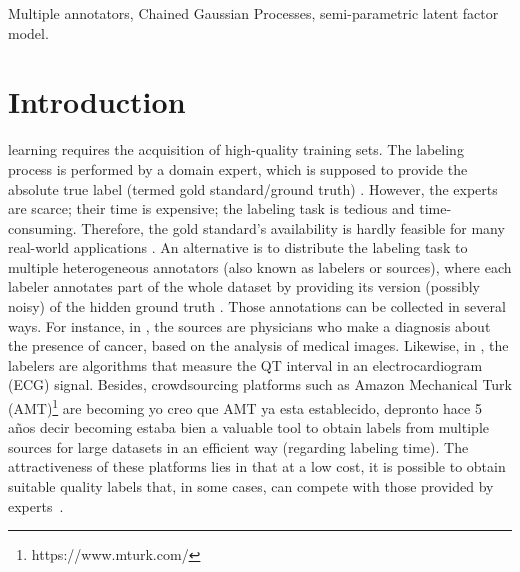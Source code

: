 \documentclass[journal]{IEEEtran}
\newcommand{\comment}[2]{{\color{blue}#1} {\color{red}#2}}
\begin{document}
\begin{IEEEkeywords}
Multiple annotators, Chained Gaussian Processes, semi-parametric latent factor model.
\end{IEEEkeywords}

%
\IEEEpeerreviewmaketitle



\section{Introduction}

 learning requires the acquisition of
high-quality training sets. The labeling process is performed by a
domain expert, which is supposed to provide the absolute true label
(termed gold standard/ground truth)
\citep{zhang2019crowdsourced}. However, the experts are scarce; their
time is expensive; the labeling task is tedious and
time-consuming. Therefore, the gold standard's availability is hardly
feasible for many real-world applications \citep{liu2020truth}. An
alternative is to distribute the labeling task to multiple
heterogeneous annotators (also known as labelers or sources), where
each labeler annotates part of the whole dataset by providing its
version (possibly noisy) of the hidden ground truth
\cite{kara2015modeling}. Those annotations can be collected in several
ways. For instance, in \cite{raykar2010learning}, the sources are
physicians who make a diagnosis about the presence of cancer, based on
the analysis of medical images. Likewise, in
\cite{zhu2019unsupervised}, the labelers are algorithms that measure
the QT interval in an electrocardiogram (ECG) signal. Besides,
crowdsourcing platforms such as Amazon Mechanical Turk
(AMT)\footnote{https://www.mturk.com/} are \comment{becoming}{yo creo que AMT ya esta establecido, depronto hace 5 a\~nos decir becoming estaba bien} a valuable tool to
obtain labels from multiple sources for large datasets in an efficient
way (regarding labeling time). The attractiveness of these platforms
lies in that at a low cost, it is possible to obtain suitable quality
labels that, in some cases, can compete with those provided by
experts~\cite{snow2008cheap}.
\end{document}

